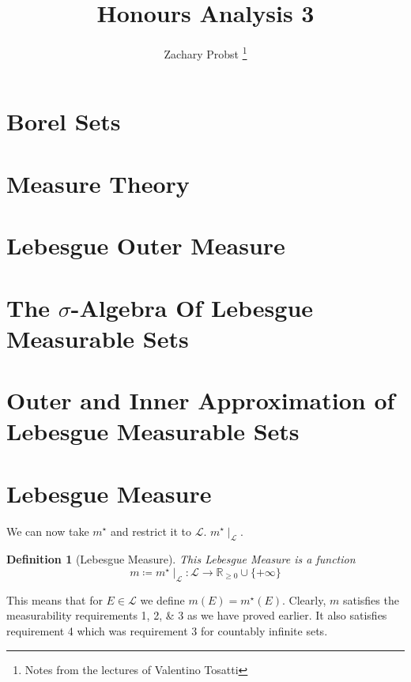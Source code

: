 \documentclass[11pt]{article}
\title{Honours Analysis 3}
\author{Zachary Probst \thanks{Notes from the lectures of Valentino Tosatti}}
\newtheorem{definition}{Definition}[section]
\newcommand{\rinf}{\mathbb{R}_{\geq 0} \cup \{ + \infty \}}
\newcommand{\mstar}[1]{m^{\star}\left(#1\right)}
\begin{document}
    \maketitle

    \section{Borel Sets}\label{sec:borel-sets}
    

    \section{Measure Theory}\label{sec:measure-theory}
    

    \section{Lebesgue Outer Measure}\label{sec:lebesgue-outer-measure}
    

    \section{The $\sigma$-Algebra Of Lebesgue Measurable Sets}\label{sec:the-$sigma$-algebra-of-lebesgue-measurable-sets}
    

    \section{Outer and Inner Approximation of Lebesgue Measurable Sets}\label{sec:outer-and-inner-approximation-of-lebesgue-measureable-sets}
    
    
    \section{Lebesgue Measure}\label{sec:lebesgue-measure}

    We can now take $m^{\star}$ and restrict it to $\mathcal{L}$. $m^{\star} \mid_{\mathcal{L}}$.
    \begin{definition}[Lebesgue Measure]
        This Lebesgue Measure is a function
        \[
            m \coloneqq m^{\star} \mid_{\mathcal{L}} : \mathcal{L} \rightarrow \rinf
        \]
    \end{definition}
    This means that for $E \in \mathcal{L}$ we define $m(E) = \mstar{E}$.
    Clearly, $m$ satisfies the measurability requirements 1, 2, \& 3 as we have proved earlier.
    It also satisfies requirement 4 which was requirement 3 for countably infinite sets.
\end{document}
